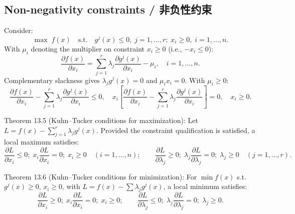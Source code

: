 \subsection{Non-negativity constraints / 非负性约束}

\begin{original}
Consider:
\[
\max \; f(x) \quad \text{s.t.} \quad g^j(x) \le 0,\; j = 1,\dots, r;\; x_i \ge 0,\; i = 1,\dots, n. \tag{13.11}
\]
With $\mu_i$ denoting the multiplier on constraint $x_i \ge 0$ (i.e., $-x_i \le 0$):
\[
\frac{\partial f(x)}{\partial x_i} = \sum_{j=1}^r \lambda_j \frac{\partial g^j(x)}{\partial x_i} - \mu_i, \quad i = 1,\dots, n. \tag{13.14}
\]
Complementary slackness gives $\lambda_j g^j(x) = 0$ and $\mu_i x_i = 0$. With $\mu_i \ge 0$:
\[
\frac{\partial f(x)}{\partial x_i} - \sum_{j=1}^r \lambda_j \frac{\partial g^j(x)}{\partial x_i} \le 0, \quad x_i\left[\frac{\partial f(x)}{\partial x_i} - \sum_{j=1}^r \lambda_j \frac{\partial g^j(x)}{\partial x_i}\right] = 0, \quad x_i \ge 0. \tag{13.15}
\]

Theorem 13.5 (Kuhn--Tucker conditions for maximization): Let $L = f(x) - \sum_{j=1}^r \lambda_j g^j(x)$. Provided the constraint qualification is satisfied, a local maximum satisfies:
\[
\frac{\partial L}{\partial x_i} \le 0;\; x_i \frac{\partial L}{\partial x_i} = 0;\; x_i \ge 0 \quad (i = 1,\dots,n); \qquad
\frac{\partial L}{\partial \lambda_j} \ge 0;\; \lambda_j \frac{\partial L}{\partial \lambda_j} = 0;\; \lambda_j \ge 0 \quad (j = 1,\dots,r). \tag{13.18}
\]

Theorem 13.6 (Kuhn--Tucker conditions for minimization): For $\min f(x)$ s.t. $g^j(x) \ge 0$, $x_i \ge 0$, with $L = f(x) - \sum \lambda_j g^j(x)$, a local minimum satisfies:
\[
\frac{\partial L}{\partial x_i} \ge 0;\; x_i \frac{\partial L}{\partial x_i} = 0;\; x_i \ge 0; \qquad
\frac{\partial L}{\partial \lambda_j} \le 0;\; \lambda_j \frac{\partial L}{\partial \lambda_j} = 0;\; \lambda_j \ge 0. \tag{13.22}
\]
\end{original}
